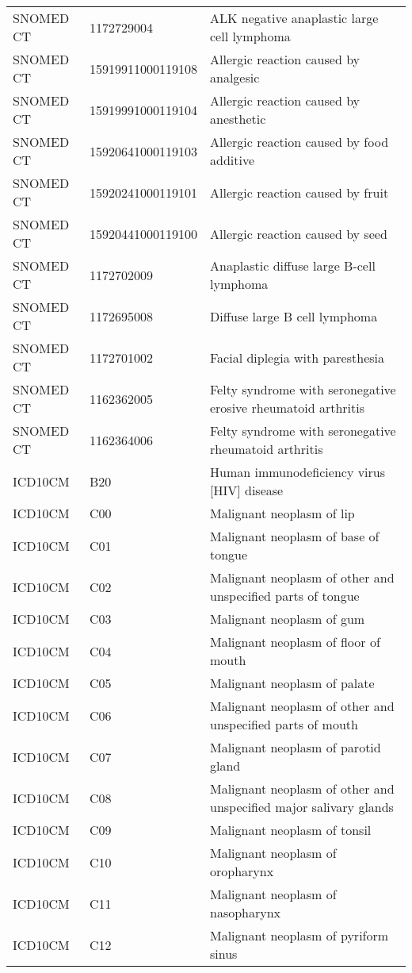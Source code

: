 \begin{longtable}{p{}p{}p{}}
  SNOMED CT & 1172729004 & ALK negative anaplastic large cell lymphoma \\ 
  SNOMED CT & 15919911000119108 & Allergic reaction caused by analgesic \\ 
  SNOMED CT & 15919991000119104 & Allergic reaction caused by anesthetic \\ 
  SNOMED CT & 15920641000119103 & Allergic reaction caused by food additive \\ 
  SNOMED CT & 15920241000119101 & Allergic reaction caused by fruit \\ 
  SNOMED CT & 15920441000119100 & Allergic reaction caused by seed \\ 
  SNOMED CT & 1172702009 & Anaplastic diffuse large B-cell lymphoma \\ 
  SNOMED CT & 1172695008 & Diffuse large B cell lymphoma \\ 
  SNOMED CT & 1172701002 & Facial diplegia with paresthesia \\ 
  SNOMED CT & 1162362005 & Felty syndrome with seronegative erosive rheumatoid arthritis \\ 
  SNOMED CT & 1162364006 & Felty syndrome with seronegative rheumatoid arthritis \\ 
  ICD10CM & B20 & Human immunodeficiency virus [HIV] disease \\ 
  ICD10CM & C00 & Malignant neoplasm of lip \\ 
  ICD10CM & C01 & Malignant neoplasm of base of tongue \\ 
  ICD10CM & C02 & Malignant neoplasm of other and unspecified parts of tongue \\ 
  ICD10CM & C03 & Malignant neoplasm of gum \\ 
  ICD10CM & C04 & Malignant neoplasm of floor of mouth \\ 
  ICD10CM & C05 & Malignant neoplasm of palate \\ 
  ICD10CM & C06 & Malignant neoplasm of other and unspecified parts of mouth \\ 
  ICD10CM & C07 & Malignant neoplasm of parotid gland \\ 
  ICD10CM & C08 & Malignant neoplasm of other and unspecified major salivary glands \\ 
  ICD10CM & C09 & Malignant neoplasm of tonsil \\ 
  ICD10CM & C10 & Malignant neoplasm of oropharynx \\ 
  ICD10CM & C11 & Malignant neoplasm of nasopharynx \\ 
  ICD10CM & C12 & Malignant neoplasm of pyriform sinus \\ 

\end{longtable}
